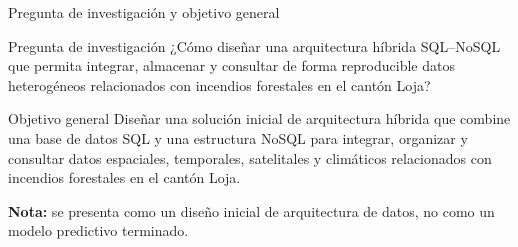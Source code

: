 \documentclass[10pt,aspectratio=169]{beamer}
\begin{document}
\begin{frame}{Pregunta de investigación y objetivo general}

\vspace*{\fill}
\begin{block}{Pregunta de investigación}
\normalsize
¿Cómo diseñar una arquitectura híbrida SQL--NoSQL que permita integrar, almacenar y consultar de forma reproducible datos heterogéneos relacionados con incendios forestales en el cantón Loja?
\end{block}

\vspace*{\fill}
\begin{block}{Objetivo general}
\normalsize
Diseñar una solución inicial de arquitectura híbrida que combine una base de datos SQL y una estructura NoSQL para integrar, organizar y consultar datos espaciales, temporales, satelitales y climáticos relacionados con incendios forestales en el cantón Loja.
\end{block}
\vspace*{\fill}

\footnotesize
\textbf{Nota:} se presenta como un diseño inicial de arquitectura de datos, no como un modelo predictivo terminado.

\end{frame}
\end{document}
